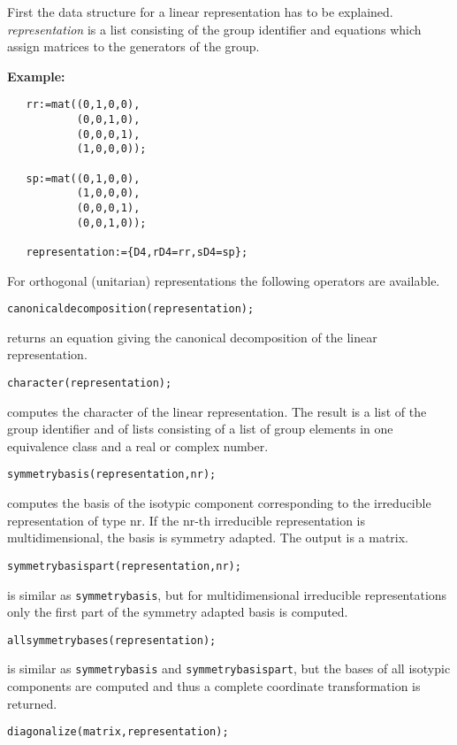 First the data structure for a linear representation has to be explained.
\emph{representation} is a list consisting of the group identifier and
equations which assign matrices to the generators of the group.

\textbf{Example:}
\begin{verbatim}
   rr:=mat((0,1,0,0),
           (0,0,1,0),
           (0,0,0,1),
           (1,0,0,0));

   sp:=mat((0,1,0,0),
           (1,0,0,0),
           (0,0,0,1),
           (0,0,1,0));

   representation:={D4,rD4=rr,sD4=sp};
\end{verbatim}

For orthogonal (unitarian) representations the following operators
are available.

\texttt{canonicaldecomposition(representation);}

returns an equation giving the canonical decomposition of the linear
representation.

\texttt{character(representation);}

computes the character of the linear representation. The result is a list
of the group identifier and of lists consisting of a
list of group elements in one equivalence class and a real or complex number.

\texttt{symmetrybasis(representation,nr);}

computes the basis of the isotypic component corresponding to the irreducible
representation of type nr. If the nr-th irreducible representation is
multidimensional, the basis is symmetry adapted. The output is a matrix.

\texttt{symmetrybasispart(representation,nr);}

is similar as \texttt{symmetrybasis}, but for multidimensional
irreducible representations only the first part of the
symmetry adapted basis is computed.

\texttt{allsymmetrybases(representation);}

is similar as \texttt{symmetrybasis} and \texttt{symmetrybasispart},
but the bases of all
isotypic components are computed and thus a
complete coordinate transformation is returned.

\texttt{diagonalize(matrix,representation);}

